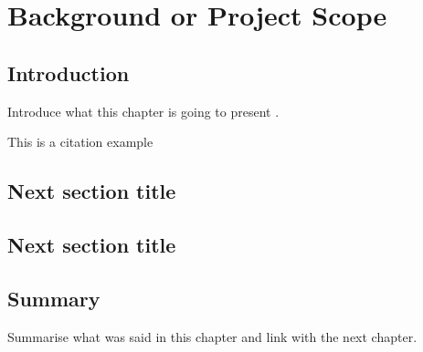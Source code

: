 \chapter{Background or Project Scope}

\section{Introduction}
Introduce what this chapter is going to present \cite{schumacher1995monitoring}.

This is a citation example \cite{mithani2018routine}
\section{Next section title}

\section{Next section title}

\section{Summary}
Summarise what was said in this chapter and link with the next chapter.
